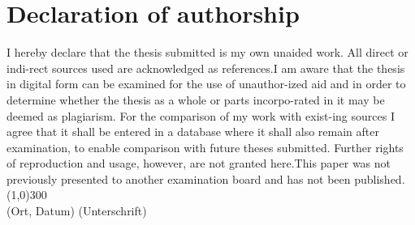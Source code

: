\section*{Declaration of authorship}

I hereby declare that the thesis submitted is my own unaided work. All direct or indi-rect sources used are acknowledged as references.I am aware that the thesis in digital form can be examined for the use of unauthor-ized  aid  and  in  order  to  determine  whether  the  thesis  as  a  whole  or  parts  incorpo-rated in it may be deemed as plagiarism. For the comparison of my work with exist-ing sources I agree that it shall be entered in a database where it shall also remain after examination, to enable comparison with future theses submitted. Further rights of reproduction and usage, however, are not granted here.This paper was not previously presented to another examination board and has not been published.
\newline
\newline
\newline
\line(1,0){300} \\
(Ort, Datum) \qquad \qquad  (Unterschrift)
